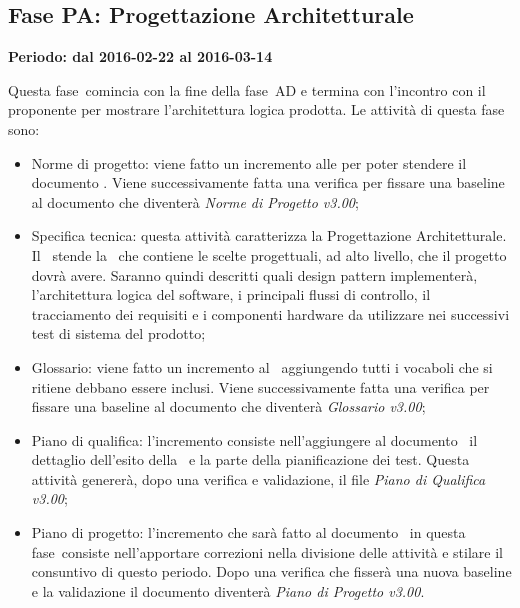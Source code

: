 \documentclass[../PianoProgetto.tex]{subfiles}
\begin{document}
	\subsection{Fase PA: Progettazione Architetturale}
		\textbf{Periodo: dal 2016-02-22 al 2016-03-14}
		
		Questa fase\g\ comincia con la fine della fase\g\ AD e termina con l'incontro con il proponente per mostrare l'architettura logica prodotta. Le attività di questa fase sono:
		\begin{itemize}
			\item Norme di progetto: viene fatto un incremento alle \normediprogetto per poter stendere il documento \specificatecnica . Viene successivamente fatta una verifica per fissare una baseline al documento che diventerà \textit{Norme di Progetto v3.00};

			\item Specifica tecnica: questa attività caratterizza la Progettazione Architetturale. Il \progettista\ stende la \specificatecnica\ che contiene le scelte progettuali, ad alto livello, che il progetto dovrà avere. Saranno quindi descritti quali design pattern implementerà, l'architettura logica del software\g , i principali flussi di controllo, il tracciamento dei requisiti e i componenti hardware da utilizzare nei successivi test di sistema del prodotto;

			\item Glossario: viene fatto un incremento al \glossario\ aggiungendo tutti i vocaboli che si ritiene debbano essere inclusi. Viene successivamente fatta una verifica per fissare una baseline al documento che diventerà \textit{Glossario v3.00};

 			\item Piano di qualifica: l'incremento consiste nell'aggiungere al documento \pianodiqualifica\ il dettaglio dell'esito della \revisionedeirequisiti\ e la parte della pianificazione dei test. Questa attività genererà, dopo una verifica e validazione, il file \textit{Piano di Qualifica v3.00};

			\item Piano di progetto: l'incremento che sarà fatto al documento \pianodiprogetto\ in questa fase\g\ consiste nell'apportare correzioni nella divisione delle attività e stilare il consuntivo di questo periodo. Dopo una verifica che fisserà una nuova baseline e la validazione il documento diventerà \textit{Piano di Progetto v3.00}.
						
		\end{itemize}
		
\end{document}
